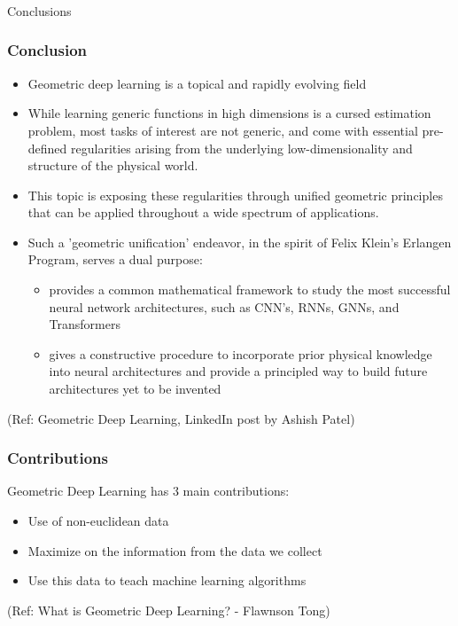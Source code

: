 \begin{frame}[fragile]\frametitle{}
\begin{center}
{\Large Conclusions}
\end{center}
\end{frame}




\begin{frame}[fragile]\frametitle{Conclusion}

\begin{itemize}
\item Geometric deep learning is a topical and rapidly evolving field
\item  While learning generic functions in high dimensions is a cursed estimation problem, most tasks of interest are not generic, and come with essential pre-defined regularities arising from the underlying low-dimensionality and structure of the physical world. 
\item This topic is  exposing these regularities through unified geometric principles that can be applied throughout a wide spectrum of applications.
\item Such a 'geometric unification' endeavor, in the spirit of Felix Klein's Erlangen Program, serves a dual purpose: 
\begin{itemize}
\item  provides a common mathematical framework to study the most successful neural network architectures, such as CNN's, RNNs, GNNs, and Transformers
\item gives a constructive procedure to incorporate prior physical knowledge into neural architectures and provide a principled way to build future architectures yet to be invented
	\end{itemize}
	\end{itemize}

{\tiny (Ref: Geometric Deep Learning, LinkedIn post by Ashish Patel)}

\end{frame}

\begin{frame}[fragile]\frametitle{Contributions}

Geometric Deep Learning has 3 main contributions:

\begin{itemize}
\item Use of non-euclidean data
\item Maximize on the information from the data we collect
\item Use this data to teach machine learning algorithms
\end{itemize}
	  
{\tiny (Ref: What is Geometric Deep Learning? - Flawnson Tong)}

\end{frame}

